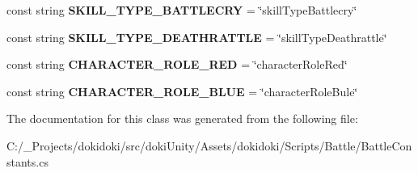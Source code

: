 \begin{DoxyCompactItemize}
\item 
const string {\bfseries S\+K\+I\+L\+L\+\_\+\+T\+Y\+P\+E\+\_\+\+B\+A\+T\+T\+L\+E\+C\+RY} = \char`\"{}skill\+Type\+Battlecry\char`\"{}\hypertarget{classdoki_battle_1_1_battle_constants_a845c4a6fb17ffd12186a69b642fda789}{}\label{classdoki_battle_1_1_battle_constants_a845c4a6fb17ffd12186a69b642fda789}

\item 
const string {\bfseries S\+K\+I\+L\+L\+\_\+\+T\+Y\+P\+E\+\_\+\+D\+E\+A\+T\+H\+R\+A\+T\+T\+LE} = \char`\"{}skill\+Type\+Deathrattle\char`\"{}\hypertarget{classdoki_battle_1_1_battle_constants_a37febc98ae0e7c3ff66a98657ad0f705}{}\label{classdoki_battle_1_1_battle_constants_a37febc98ae0e7c3ff66a98657ad0f705}

\item 
const string {\bfseries C\+H\+A\+R\+A\+C\+T\+E\+R\+\_\+\+R\+O\+L\+E\+\_\+\+R\+ED} = \char`\"{}character\+Role\+Red\char`\"{}\hypertarget{classdoki_battle_1_1_battle_constants_acd1027c67237338746ac0971ffaf85d7}{}\label{classdoki_battle_1_1_battle_constants_acd1027c67237338746ac0971ffaf85d7}

\item 
const string {\bfseries C\+H\+A\+R\+A\+C\+T\+E\+R\+\_\+\+R\+O\+L\+E\+\_\+\+B\+L\+UE} = \char`\"{}character\+Role\+Bule\char`\"{}\hypertarget{classdoki_battle_1_1_battle_constants_a2968860f3c386c4c8932e03d5bcf345a}{}\label{classdoki_battle_1_1_battle_constants_a2968860f3c386c4c8932e03d5bcf345a}

\end{DoxyCompactItemize}


The documentation for this class was generated from the following file\+:\begin{DoxyCompactItemize}
\item 
C\+:/\+\_\+\+Projects/dokidoki/src/doki\+Unity/\+Assets/dokidoki/\+Scripts/\+Battle/Battle\+Constants.\+cs\end{DoxyCompactItemize}
